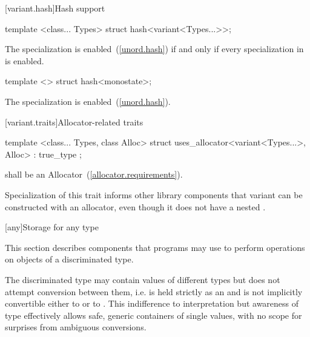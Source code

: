 [variant.hash]{Hash support}

%
\begin{itemdecl}
template <class... Types> struct hash<variant<Types...>>;
\end{itemdecl}

\begin{itemdescr}
\pnum
The specialization  is enabled~(\ref{unord.hash})
if and only if every specialization in  is enabled.
\end{itemdescr}

%
\begin{itemdecl}
template <> struct hash<monostate>;
\end{itemdecl}

\begin{itemdescr}
\pnum
The specialization is enabled~(\ref{unord.hash}).
\end{itemdescr}


[variant.traits]{Allocator-related traits}

%
\begin{itemdecl}
template <class... Types, class Alloc>
  struct uses_allocator<variant<Types...>, Alloc> : true_type { };
\end{itemdecl}

\begin{itemdescr}
\pnum
\requires {} shall be an Allocator~(\ref{allocator.requirements}).

\pnum
\begin{note}
Specialization of this trait informs other library components
that variant can be constructed with an allocator,
even though it does not have a nested .
\end{note}
\end{itemdescr}


[any]{Storage for any type}

\pnum
This section describes components that \Cpp programs may use to perform operations on objects of a discriminated type.

\pnum
\begin{note}
The discriminated type may contain values of different types but does not attempt conversion between them,
i.e.  is held strictly as an  and is not implicitly convertible either to  or to .
This indifference to interpretation but awareness of type effectively allows safe, generic containers of single values, with no scope for surprises from ambiguous conversions.
\end{note}


